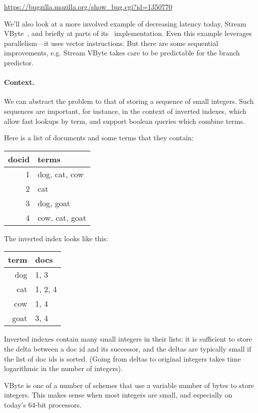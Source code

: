 \begin{center}
\url{https://bugzilla.mozilla.org/show_bug.cgi?id=1350770}
\end{center}

We'll also look at a more involved example of decreasing latency today, Stream VByte~\cite{LEMIRE20181}, and briefly at parts of its \CPP~implementation.
Even this example leverages parallelism---it uses vector instructions. But there
are some sequential improvements, e.g. Stream VByte takes care to be predictable
for the branch predictor.

\paragraph{Context.} We can abstract the problem to that of storing a sequence of small integers.
Such sequences are important, for instance, in the context of inverted indexes, which allow
fast lookups by term, and support boolean queries which combine terms.

Here is a list of documents and some terms that they contain:
\begin{center}
\begin{tabular}{r|l}
docid & terms \\ \hline
1 & dog, cat, cow\\
2 & cat\\
3 & dog, goat\\
4 & cow, cat, goat\\
\end{tabular}
\end{center}

The inverted index looks like this:
\begin{center}
\begin{tabular}{r|l}
term & docs \\ \hline
dog & 1, 3 \\
cat & 1, 2, 4 \\
cow & 1, 4 \\
goat & 3, 4
\end{tabular}
\end{center}

Inverted indexes contain many small integers in their lists: it is
sufficient to store the delta between a doc id and its successor, and
the deltas are typically small if the list of doc ids is sorted.
(Going from deltas to original integers takes time logarithmic
in the number of integers).

VByte is one of a number of schemes that use a variable number of
bytes to store integers.  This makes sense when most integers are
small, and especially on today's 64-bit processors.

